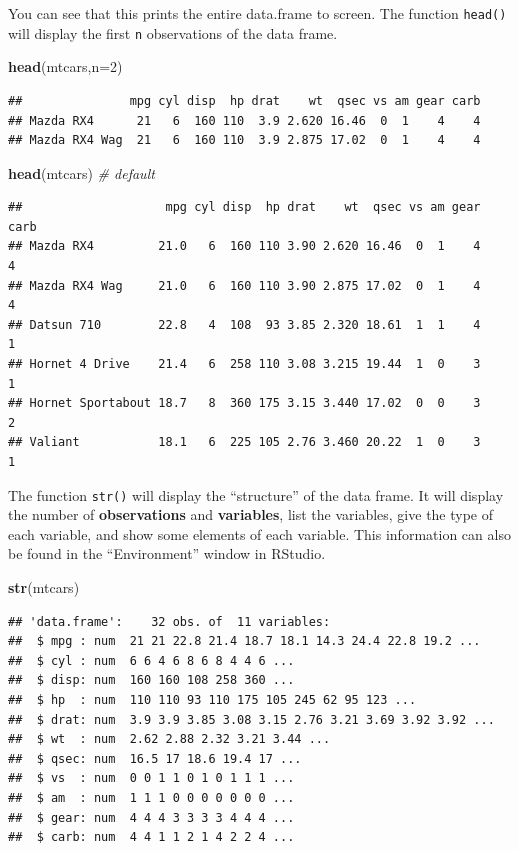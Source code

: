 \documentclass[]{book}
\newenvironment{Shaded}{\begin{snugshade}}{\end{snugshade}}
\newcommand{\KeywordTok}[1]{\textcolor[rgb]{0.13,0.29,0.53}{\textbf{#1}}}
\newcommand{\DataTypeTok}[1]{\textcolor[rgb]{0.13,0.29,0.53}{#1}}
\newcommand{\DecValTok}[1]{\textcolor[rgb]{0.00,0.00,0.81}{#1}}
\newcommand{\CommentTok}[1]{\textcolor[rgb]{0.56,0.35,0.01}{\textit{#1}}}
\newcommand{\NormalTok}[1]{#1}
\begin{document}
You can see that this prints the entire data.frame to screen. The
function \texttt{head()} will display the first \texttt{n} observations
of the data frame.

\begin{Shaded}
\begin{Highlighting}[]
\KeywordTok{head}\NormalTok{(mtcars,}\DataTypeTok{n=}\DecValTok{2}\NormalTok{)}
\end{Highlighting}
\end{Shaded}

\begin{verbatim}
##               mpg cyl disp  hp drat    wt  qsec vs am gear carb
## Mazda RX4      21   6  160 110  3.9 2.620 16.46  0  1    4    4
## Mazda RX4 Wag  21   6  160 110  3.9 2.875 17.02  0  1    4    4
\end{verbatim}

\begin{Shaded}
\begin{Highlighting}[]
\KeywordTok{head}\NormalTok{(mtcars) }\CommentTok{# default}
\end{Highlighting}
\end{Shaded}

\begin{verbatim}
##                    mpg cyl disp  hp drat    wt  qsec vs am gear carb
## Mazda RX4         21.0   6  160 110 3.90 2.620 16.46  0  1    4    4
## Mazda RX4 Wag     21.0   6  160 110 3.90 2.875 17.02  0  1    4    4
## Datsun 710        22.8   4  108  93 3.85 2.320 18.61  1  1    4    1
## Hornet 4 Drive    21.4   6  258 110 3.08 3.215 19.44  1  0    3    1
## Hornet Sportabout 18.7   8  360 175 3.15 3.440 17.02  0  0    3    2
## Valiant           18.1   6  225 105 2.76 3.460 20.22  1  0    3    1
\end{verbatim}

The function \texttt{str()} will display the ``structure'' of the data
frame. It will display the number of \textbf{observations} and
\textbf{variables}, list the variables, give the type of each variable,
and show some elements of each variable. This information can also be
found in the ``Environment'' window in RStudio.

\begin{Shaded}
\begin{Highlighting}[]
\KeywordTok{str}\NormalTok{(mtcars)}
\end{Highlighting}
\end{Shaded}

\begin{verbatim}
## 'data.frame':    32 obs. of  11 variables:
##  $ mpg : num  21 21 22.8 21.4 18.7 18.1 14.3 24.4 22.8 19.2 ...
##  $ cyl : num  6 6 4 6 8 6 8 4 4 6 ...
##  $ disp: num  160 160 108 258 360 ...
##  $ hp  : num  110 110 93 110 175 105 245 62 95 123 ...
##  $ drat: num  3.9 3.9 3.85 3.08 3.15 2.76 3.21 3.69 3.92 3.92 ...
##  $ wt  : num  2.62 2.88 2.32 3.21 3.44 ...
##  $ qsec: num  16.5 17 18.6 19.4 17 ...
##  $ vs  : num  0 0 1 1 0 1 0 1 1 1 ...
##  $ am  : num  1 1 1 0 0 0 0 0 0 0 ...
##  $ gear: num  4 4 4 3 3 3 3 4 4 4 ...
##  $ carb: num  4 4 1 1 2 1 4 2 2 4 ...
\end{verbatim}
\end{document}
